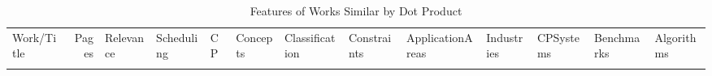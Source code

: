 {\scriptsize
\begin{longtable}{>{\raggedright\arraybackslash}p{3cm}r>{\raggedright\arraybackslash}p{1.0cm}>{\raggedright\arraybackslash}p{ 1.50cm}>{\raggedright\arraybackslash}p{ 1.50cm}>{\raggedright\arraybackslash}p{ 1.50cm}>{\raggedright\arraybackslash}p{ 1.50cm}>{\raggedright\arraybackslash}p{ 1.50cm}>{\raggedright\arraybackslash}p{ 1.50cm}>{\raggedright\arraybackslash}p{ 1.50cm}>{\raggedright\arraybackslash}p{ 1.50cm}>{\raggedright\arraybackslash}p{ 1.50cm}>{\raggedright\arraybackslash}p{ 1.50cm}}
\rowcolor{white}\caption{Features of Works Similar by Dot Product}\\ \toprule
\rowcolor{white}Work/Title & Pages & Relevance & Scheduling& CP& Concepts& Classification& Constraints& ApplicationAreas& Industries& CPSystems& Benchmarks& Algorithms\\ \midrule\endhead
\bottomrule
\endfoot

\end{longtable}}
